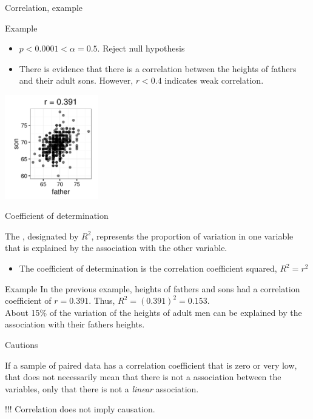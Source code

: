 \documentclass[xcolor=table, aspectratio=169, bigger, handout]{beamer}
\begin{document}
\begin{frame}{Correlation, example}
\begin{exampleblock}{Example}
\begin{itemize}
\item $p < 0.0001 < \alpha = 0.5$. Reject null hypothesis
\item There is evidence that there is a correlation between the heights of fathers and their adult sons. However, $r < 0.4$ indicates weak correlation.
\end{itemize} 
\end{exampleblock}
\medskip
{\centering
\includegraphics[width=1.6in]{../images/ch10_cor_galton}
\par}
\end{frame}

\begin{frame}{Coefficient of determination}
\begin{block}{}
The , designated by $R^2$, represents the proportion of variation in one variable that is explained by the association with the other variable.
\begin{itemize}
\item The coefficient of determination is the correlation coefficient squared,  $R^2 = r^2$
\end{itemize}
\end{block}

\pause
\begin{exampleblock}{Example}
In the previous example, heights of fathers and sons had a correlation coefficient of $r=0.391$. Thus, $R^2 = (0.391)^2 = 0.153$.\\
\medskip
About 15\% of the variation of the heights of adult men can be explained by the association with their fathers heights.
\end{exampleblock}
\end{frame}

\begin{frame}{Cautions}
\begin{block}{}
If a sample of paired data has a correlation coefficient that is zero or very low, that does not necessarily mean that there is not a association between the variables, only that there is not a \emph{linear} association. 
\end{block}

\pause
\begin{alertblock}{!!!}
\large
Correlation does not imply causation.
\end{alertblock}
\end{frame}
\end{document}
